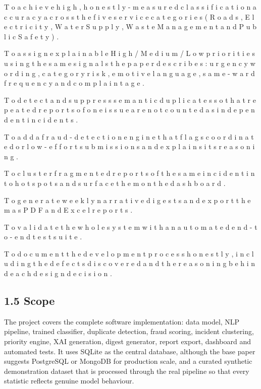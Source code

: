 \documentclass[10pt,letterpaper,oneside]{article}\usepackage{geometry}\geometry{top=1in,bottom=1in,left=1in,right=1in,includeheadfoot}\usepackage{xcolor}\definecolor{color@navy}{HTML}{1F3B63}\definecolor{color@grey}{HTML}{404040}\definecolor{color@hdr}{HTML}{F2F4F7}\usepackage{titlesec}\titleformat{\section}  {\normalfont\huge\bfseries\color@navy}  {}{0pt}{\MakeUppercase}\titleformat{\subsection}  {\normalfont\Large\bfseries\color@navy}  {}{0pt}{}\titleformat{\subsubsection}  {\normalfont\large\bfseries\color@navy}  {}{0pt}{}\titlespacing*{\section}{0pt}{14pt}{6pt}\titlespacing*{\subsection}{0pt}{10pt}{4pt}\titlespacing*{\subsubsection}{0pt}{8pt}{3pt}\setlength{\parindent}{0pt}\setlength{\parskip}{0.6em}\parindent=0pt\usepackage{enumitem}\setlist{nosep,leftmargin=*,itemsep=0pt,topsep=2pt,partopsep=0pt}\usepackage{array}\usepackage{booktabs}\usepackage{caption}\captionsetup{font={small,it},labelfont={bf},labelsep=period,  parskip=2pt,skip=4pt,list=no}\captionsetup[table]{labelfont={bf,small,color@navy},name=Table}\usepackage{graphicx}\usepackage{verbatim}\usepackage{ragged2e}\usepackage{longtable}\usepackage{tabularx}\usepackage{multirow}\usepackage{colortbl}\definecolor{rowshade}{HTML}{F2F4F7}\usepackage{tikz}\usetikzlibrary{positioning,calc}\usepackage[hidelinks]{hyperref}\hypersetup{colorlinks=true,linkcolor=color@navy,urlcolor=color@navy}\pagestyle{fancy}\fancyhf{}\renewcommand{\headrulewidth}{0.4pt}\fancyhead[L]{\small\color@navy CivicSense — Project Report}\fancyhead[R]{\small\color@grey October 11, 2026}\fancyfoot[C]{\small\color@grey An Integrated Intelligent Triage Pipelin}\fancyfoot[R]{\small\color@grey Page \thepage}\usepackage{setspace}\setstretch{1.15}\AtBeginDocument{  \hypersetup{pdftitle={An Integrated Intelligent Triage Pipeline for AI-Enhanced Citizen Complaint Management},    pdfauthor={CivicSense Project Team},    pdfsubject={Project Report},    pdfkeywords={smart cities, NLP, complaint management, e-governance},    pdfcreator={CivicSense Project Team}  }}
\begin{document}
\item T o   a c h i e v e   h i g h ,   h o n e s t l y - m e a s u r e d   c l a s s i f i c a t i o n   a c c u r a c y   a c r o s s   t h e   f i v e   s e r v i c e   c a t e g o r i e s   ( R o a d s ,   E l e c t r i c i t y ,   W a t e r   S u p p l y ,   W a s t e   M a n a g e m e n t   a n d   P u b l i c   S a f e t y ) .

\item T o   a s s i g n   e x p l a i n a b l e   H i g h   /   M e d i u m   /   L o w   p r i o r i t i e s   u s i n g   t h e   s a m e   s i g n a l s   t h e   p a p e r   d e s c r i b e s :   u r g e n c y   w o r d i n g ,   c a t e g o r y   r i s k ,   e m o t i v e   l a n g u a g e ,   s a m e - w a r d   f r e q u e n c y   a n d   c o m p l a i n t   a g e .

\item T o   d e t e c t   a n d   s u p p r e s s   s e m a n t i c   d u p l i c a t e s   s o   t h a t   r e p e a t e d   r e p o r t s   o f   o n e   i s s u e   a r e   n o t   c o u n t e d   a s   i n d e p e n d e n t   i n c i d e n t s .

\item T o   a d d   a   f r a u d - d e t e c t i o n   e n g i n e   t h a t   f l a g s   c o o r d i n a t e d   o r   l o w - e f f o r t   s u b m i s s i o n s   a n d   e x p l a i n s   i t s   r e a s o n i n g .

\item T o   c l u s t e r   f r a g m e n t e d   r e p o r t s   o f   t h e   s a m e   i n c i d e n t   i n t o   h o t s p o t s   a n d   s u r f a c e   t h e m   o n   t h e   d a s h b o a r d .

\item T o   g e n e r a t e   w e e k l y   n a r r a t i v e   d i g e s t s   a n d   e x p o r t   t h e m   a s   P D F   a n d   E x c e l   r e p o r t s .

\item T o   v a l i d a t e   t h e   w h o l e   s y s t e m   w i t h   a n   a u t o m a t e d   e n d - t o - e n d   t e s t   s u i t e .

\item T o   d o c u m e n t   t h e   d e v e l o p m e n t   p r o c e s s   h o n e s t l y ,   i n c l u d i n g   t h e   d e f e c t s   d i s c o v e r e d   a n d   t h e   r e a s o n i n g   b e h i n d   e a c h   d e s i g n   d e c i s i o n .

\subsection*{1.5 Scope}
The project covers the complete software implementation: data model, NLP pipeline, trained classifier, duplicate detection, fraud scoring, incident clustering, priority engine, XAI generation, digest generator, report export, dashboard and automated tests. It uses SQLite as the central database, although the base paper suggests PostgreSQL or MongoDB for production scale, and a curated synthetic demonstration dataset that is processed through the real pipeline so that every statistic reflects genuine model behaviour.
\end{document}
